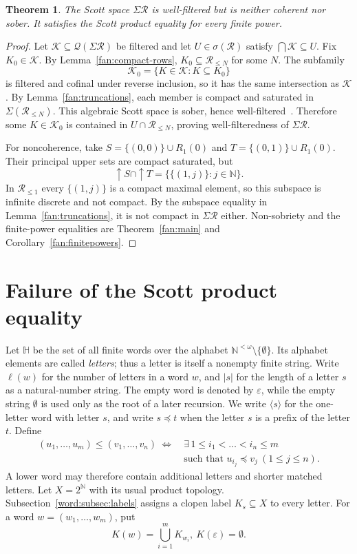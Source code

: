 \documentclass[fleqn,preprint,3p,a4paper]{elsarticle}
\newtheorem{theorem}{Theorem}[section]
\theoremstyle{definition}
\newcommand{\N}{\mathbb N}
\newcommand{\HH}{\mathbb H}
\newcommand{\RR}{\mathcal R}
\begin{document}
\begin{theorem}\label{fan:wellfiltered}
The Scott space $\Sigma\RR$ is well-filtered but is neither coherent nor sober. It satisfies the Scott product equality for every finite power.
\end{theorem}
\begin{proof}
Let $\mathcal K\subseteq\mathcal Q(\Sigma\RR)$ be filtered and let $U\in\sigma(\RR)$ satisfy $\bigcap\mathcal K\subseteq U$. Fix $K_0\in\mathcal K$. By Lemma~\ref{fan:compact-rows}, $K_0\subseteq\RR_{\leq N}$ for some $N$. The subfamily
\[
 \mathcal K_0=\{K\in\mathcal K:K\subseteq K_0\}
\]
is filtered and cofinal under reverse inclusion, so it has the same intersection as $\mathcal K$. By Lemma~\ref{fan:truncations}, each member is compact and saturated in $\Sigma(\RR_{\leq N})$. This algebraic Scott space is sober, hence well-filtered~\cite[Section~II-1]{GHK}. Therefore some $K\in\mathcal K_0$ is contained in $U\cap\RR_{\leq N}$, proving well-filteredness of $\Sigma\RR$.

For noncoherence, take $S=\{(0,0)\}\cup R_1(0)$ and $T=\{(0,1)\}\cup R_1(0)$. Their principal upper sets are compact saturated, but
\[
 {\uparrow} S\cap{\uparrow} T
 =\bigl\{\{(1,j)\}:j\in\N\bigr\}.
\]
In $\RR_{\leq1}$ every $\{(1,j)\}$ is a compact maximal element, so this subspace is infinite discrete and not compact. By the subspace equality in Lemma~\ref{fan:truncations}, it is not compact in $\Sigma\RR$ either. Non-sobriety and the finite-power equalities are Theorem~\ref{fan:main} and Corollary~\ref{fan:finitepowers}.
\end{proof}

\section{Failure of the Scott product equality}\label{sec:word}
Let $\HH$ be the set of all finite words over the alphabet
$\N^{<\omega}\setminus\{\emptyset\}$. Its alphabet elements are called \emph{letters}; thus a letter is itself a nonempty finite string. Write $\ell(w)$ for the number of letters in a word $w$, and $|s|$ for the length of a letter $s$ as a natural-number string. The empty word is denoted by $\varepsilon$, while the empty string $\emptyset$ is used only as the root of a later recursion. We write $\langle s\rangle$ for the one-letter word with letter $s$, and write $s\preceq t$ when the letter $s$ is a prefix of the letter $t$. Define
\begin{equation}\label{word:eq:order}
\begin{aligned}
(u_1,\ldots,u_m)\leq(v_1,\ldots,v_n)
~\Longleftrightarrow~
&\exists\,1\leq i_1<\ldots<i_n\leq m\\
&\text{such that }u_{i_j}\preceq v_j~(1\leq j\leq n).
\end{aligned}
\end{equation}
A lower word may therefore contain additional letters and shorter matched letters. Let $X=2^{\N}$ with its usual product topology. Subsection~\ref{word:subsec:labels} assigns a clopen label $K_s\subseteq X$ to every letter. For a word $w=(w_1,\ldots,w_m)$, put
\[
 K(w)=\bigcup_{i=1}^m K_{w_i},
 ~
 K(\varepsilon)=\emptyset.
\]
\end{document}
